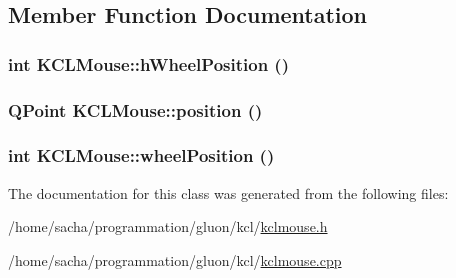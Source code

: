 \subsection{Member Function Documentation}
\hypertarget{class_k_c_l_mouse_75f221554270e5bcffdf6b671a62f01a}{
\subsubsection[{hWheelPosition}]{\setlength{\rightskip}{0pt plus 5cm}int KCLMouse::hWheelPosition ()}}
\label{class_k_c_l_mouse_75f221554270e5bcffdf6b671a62f01a}


\hypertarget{class_k_c_l_mouse_0385a723fb0ec739f8943627764a53fb}{
\subsubsection[{position}]{\setlength{\rightskip}{0pt plus 5cm}QPoint KCLMouse::position ()}}
\label{class_k_c_l_mouse_0385a723fb0ec739f8943627764a53fb}


\hypertarget{class_k_c_l_mouse_a913b0b518584db62a341ad75ee49119}{
\subsubsection[{wheelPosition}]{\setlength{\rightskip}{0pt plus 5cm}int KCLMouse::wheelPosition ()}}
\label{class_k_c_l_mouse_a913b0b518584db62a341ad75ee49119}




The documentation for this class was generated from the following files:\begin{CompactItemize}
\item 
/home/sacha/programmation/gluon/kcl/\hyperlink{kclmouse_8h}{kclmouse.h}\item 
/home/sacha/programmation/gluon/kcl/\hyperlink{kclmouse_8cpp}{kclmouse.cpp}\end{CompactItemize}
